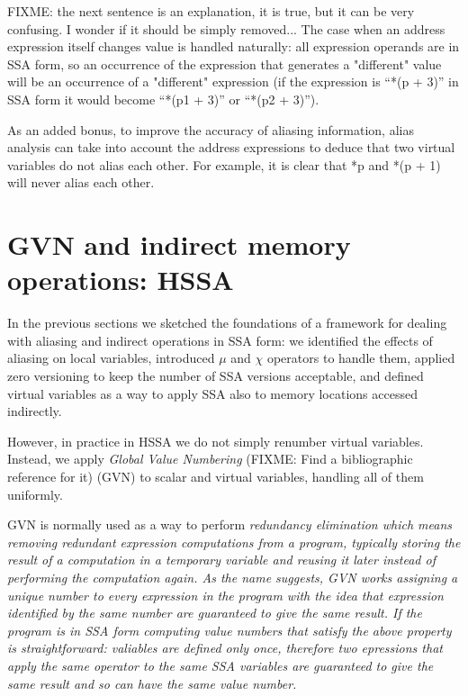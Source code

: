 FIXME: the next sentence is an explanation, it is true, but it can be very confusing. I wonder if it should be simply removed...
The case when an address expression itself changes value is handled naturally: all expression operands are in SSA form, so an occurrence of the expression that generates a "different" value will be an occurrence of a "different" expression (if the expression is ``*(p + 3)'' in SSA form it would become ``*(p1 + 3)'' or ``*(p2 + 3)'').

As an added bonus, to improve the accuracy of aliasing information, alias analysis can take into account the address expressions to deduce that two virtual variables do not alias each other.
For example, it is clear that *p and *(p + 1) will never alias each other.


\section{GVN and indirect memory operations: HSSA}

In the previous sections we sketched the foundations of a framework for dealing with aliasing and indirect operations in SSA form: we identified the effects of aliasing on local variables, introduced $\mu$ and $\chi$ operators to handle them, applied zero versioning to keep the number of SSA versions acceptable, and defined virtual variables as a way to apply SSA also to memory locations accessed indirectly.

However, in practice in HSSA we do not simply renumber virtual variables.
Instead, we apply {\em Global Value Numbering} (FIXME: Find a bibliographic reference for it) (GVN) to scalar and virtual variables, handling all of them uniformly.

GVN is normally used as a way to perform \em{redundancy elimination} which means removing redundant expression computations from a program, typically storing the result of a computation in a temporary variable and reusing it later instead of performing the computation again.
As the name suggests, GVN works assigning a unique number to every expression in the program with the idea that expression identified by the same number are guaranteed to give the same result.
If the program is in SSA form computing value numbers that satisfy the above property is straightforward: valiables are defined only once, therefore two epressions that apply the same operator to the same SSA variables are guaranteed to give the same result and so can have the same value number.

